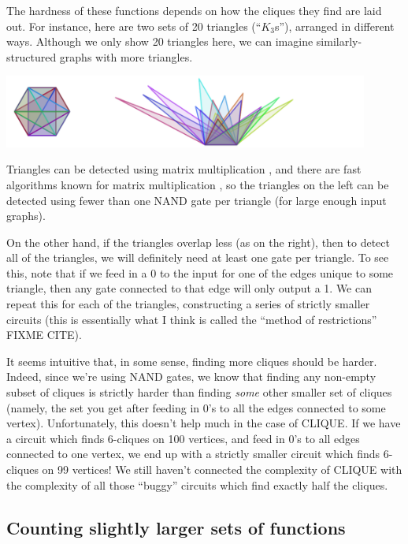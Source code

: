 \documentclass[12pt]{article}
\theoremstyle{definition}
\begin{document}
The hardness of these functions depends
on how the cliques they find are laid out.
For instance, here are two sets of 20 triangles (``$K_3$s''),
arranged in different ways. Although we only show 20 triangles here,
we can imagine similarly-structured graphs with more triangles.

\includegraphics[width=0.9\textwidth]{R/tri1.pdf}

Triangles can be detected using matrix multiplication \cite{itai_finding_1977},
and there are fast algorithms known for matrix multiplication
\cite{strassen_gaussian_1969}
\cite{williams_multiplying_2012}, so
the triangles on the left can be detected
using fewer than one NAND gate per triangle (for large enough input graphs).

On the other hand, if the triangles overlap less (as on the right),
then to detect all of the triangles, we will definitely need at least one
gate per triangle.
To see this, note that if we feed in a 0 to the input for one
of the edges unique to some triangle, then any gate connected to
that edge will only output a 1. We can repeat this for each of the
triangles, constructing a series of strictly smaller circuits
(this is essentially what I think is called
the ``method of restrictions'' FIXME CITE).

It seems intuitive that, in some sense, finding more cliques should
be harder.
Indeed, since we're using NAND gates, we know that finding any non-empty
subset of cliques is strictly harder than finding {\em some} other 
smaller set of cliques (namely, the set you get after feeding in 0's to
all the edges connected to some vertex).
Unfortunately, this doesn't help much
in the case of CLIQUE.  If we have a circuit which
finds 6-cliques on 100 vertices, and feed in 0's to all edges connected to
one vertex, we
end up with a strictly smaller circuit which finds 6-cliques on
99 vertices! We still haven't connected the complexity of CLIQUE with
the complexity of all those ``buggy'' circuits which find exactly half
the cliques.

\subsection{Counting slightly larger sets of functions}
\end{document}
